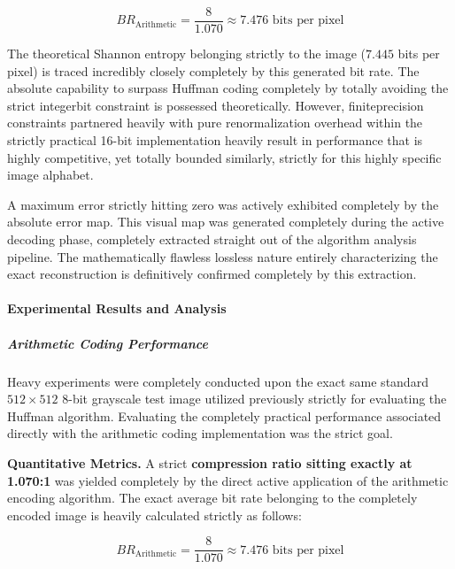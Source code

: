 \begin{equation}
    BR_{\text{Arithmetic}} = \frac{8}{1.070} \approx 7.476 \text{ bits per pixel}
\end{equation}

The theoretical Shannon entropy belonging strictly to the image ($7.445$ bits per pixel) is traced incredibly closely completely by this generated bit rate. The absolute capability to surpass Huffman coding completely by totally avoiding the strict integerbit constraint is possessed theoretically. However, finiteprecision constraints partnered heavily with pure renormalization overhead within the strictly practical 16-bit implementation heavily result in performance that is highly competitive, yet totally bounded similarly, strictly for this highly specific image alphabet. 

A maximum error strictly hitting zero was actively exhibited completely by the absolute error map. This visual map was generated completely during the active decoding phase, completely extracted straight out of the algorithm analysis pipeline. The mathematically flawless lossless nature entirely characterizing the exact reconstruction is definitively confirmed completely by this extraction.


\paragraph{Experimental Results and Analysis}

\subparagraph{Arithmetic Coding Performance}

Heavy experiments were completely conducted upon the exact same standard $512 \times 512$ 8-bit grayscale test image utilized previously strictly for evaluating the Huffman algorithm. Evaluating the completely practical performance associated directly with the arithmetic coding implementation was the strict goal. 

\vspace{1em}
\noindent\textbf{Quantitative Metrics.} A strict \textbf{compression ratio sitting exactly at 1.070:1} was yielded completely by the direct active application of the arithmetic encoding algorithm. The exact average bit rate belonging to the completely encoded image is heavily calculated strictly as follows:

\begin{equation}
    BR_{\text{Arithmetic}} = \frac{8}{1.070} \approx 7.476 \text{ bits per pixel}
\end{equation}

